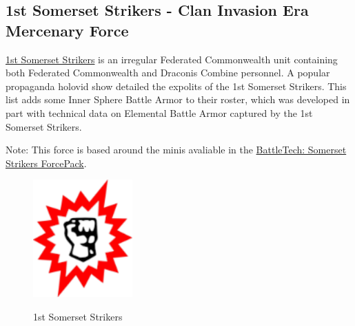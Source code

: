 \subsection{1st Somerset Strikers - Clan Invasion Era Mercenary Force}

\href{https://www.sarna.net/wiki/1st_Somerset_Strikers}{1st Somerset Strikers} is an irregular Federated Commonwealth unit containing both Federated Commonwealth and Draconis Combine  personnel.
A popular propaganda holovid show detailed the expolits of the 1st Somerset Strikers.
This list adds some Inner Sphere Battle Armor to their roster, which was developed in part with technical data on Elemental Battle Armor captured by the 1st Somerset Strikers.

Note: This force is based around the minis avaliable in the \href{https://www.sarna.net/wiki/BattleTech:_Somerset_Strikers_ForcePack}{BattleTech: Somerset Strikers ForcePack}.

\begin{figure}[!h]
  \centering
  \includegraphics[alt='1st Somerset Strikers Logo', width=1.5in, height=1.778in]{img/1st-Somerset-Strikers.png}
  \caption*{1st Somerset Strikers}
\end{figure}

